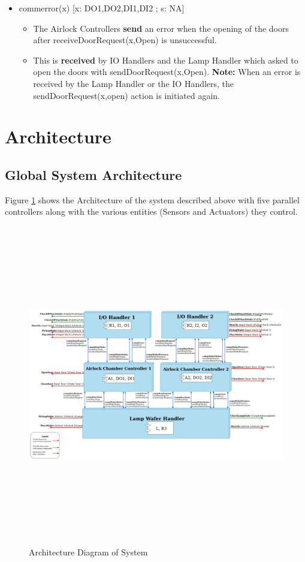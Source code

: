 \documentclass[a4paper,12pt]{article}
\begin{document}
\begin{itemize}
		\bigskip
		
		\item commerror(x) [x: DO1,DO2,DI1,DI2 ; s: NA]
		\begin{itemize}
			\item The Airlock Controllers \textbf{send} an error when the opening of the doors after receiveDoorRequest(x,Open) is unsuccessful. 
			\item This is \textbf{received} by IO Handlers and the Lamp Handler which asked to open the doors with sendDoorRequest(x,Open).
			\textbf{Note:} When an error is received by the Lamp Handler or the IO Handlers, the sendDoorRequest(x,open) action is initiated again.
		\end{itemize}
	\end{itemize}
	
	\newpage
	\section{Architecture}
	\subsection{Global System Architecture}
	Figure \ref{fig:arch1} shows the Architecture of the system described above with five parallel controllers along with the various entities (Sensors and Actuators) they control.\\
	
	\begin{figure}[ht]
		\centerline{
			\includegraphics[width=20cm, height=14cm]{Architecture(last).jpg}}
		\caption{Architecture Diagram of System}
		\label{fig:arch1}
	\end{figure}
	\newpage
\end{document}
